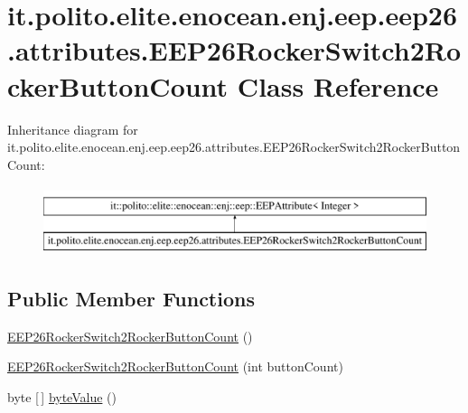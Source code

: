 \hypertarget{classit_1_1polito_1_1elite_1_1enocean_1_1enj_1_1eep_1_1eep26_1_1attributes_1_1_e_e_p26_rocker_switch2_rocker_button_count}{}\section{it.\+polito.\+elite.\+enocean.\+enj.\+eep.\+eep26.\+attributes.\+E\+E\+P26\+Rocker\+Switch2\+Rocker\+Button\+Count Class Reference}
\label{classit_1_1polito_1_1elite_1_1enocean_1_1enj_1_1eep_1_1eep26_1_1attributes_1_1_e_e_p26_rocker_switch2_rocker_button_count}
Inheritance diagram for it.\+polito.\+elite.\+enocean.\+enj.\+eep.\+eep26.\+attributes.\+E\+E\+P26\+Rocker\+Switch2\+Rocker\+Button\+Count\+:\begin{figure}[H]
\begin{center}
\leavevmode
\includegraphics[height=2.000000cm]{classit_1_1polito_1_1elite_1_1enocean_1_1enj_1_1eep_1_1eep26_1_1attributes_1_1_e_e_p26_rocker_switch2_rocker_button_count}
\end{center}
\end{figure}
\subsection*{Public Member Functions}
\begin{DoxyCompactItemize}
\item 
\hyperlink{classit_1_1polito_1_1elite_1_1enocean_1_1enj_1_1eep_1_1eep26_1_1attributes_1_1_e_e_p26_rocker_switch2_rocker_button_count_ae09aa31944b54db51cda3e70e65e1c16}{E\+E\+P26\+Rocker\+Switch2\+Rocker\+Button\+Count} ()
\item 
\hyperlink{classit_1_1polito_1_1elite_1_1enocean_1_1enj_1_1eep_1_1eep26_1_1attributes_1_1_e_e_p26_rocker_switch2_rocker_button_count_a77f6b7d9e9ad3a2b4c495e710909cd9a}{E\+E\+P26\+Rocker\+Switch2\+Rocker\+Button\+Count} (int button\+Count)
\item 
byte \mbox{[}$\,$\mbox{]} \hyperlink{classit_1_1polito_1_1elite_1_1enocean_1_1enj_1_1eep_1_1eep26_1_1attributes_1_1_e_e_p26_rocker_switch2_rocker_button_count_ac9b35997f21c39200cce39407fd440f6}{byte\+Value} ()
\end{DoxyCompactItemize}
